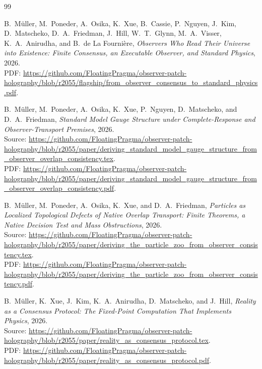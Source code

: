 \documentclass[11pt]{article}
\numberwithin{equation}{section}
\theoremstyle{remark}
\begin{document}
\begin{thebibliography}{99}

B.~M\"uller, M.~Poneder, A.~Osika, K.~Xue, B.~Cassie, P.~Nguyen, J.~Kim, D.~Matscheko, D.~A.~Friedman, J.~Hill, W.~T.~Glynn, M.~A.~Visser, K.~A.~Anirudha, and B.~de La Fourni\`ere,
\emph{Observers Who Read Their Universe into Existence: Finite Consensus, an Executable Observer, and Standard Physics},
2026.\\
PDF: \url{https://github.com/FloatingPragma/observer-patch-holography/blob/r2055/flagship/from_observer_consensus_to_standard_physics.pdf}.

B.~M\"uller, M.~Poneder, A.~Osika, K.~Xue, P.~Nguyen, D.~Matscheko, and D.~A.~Friedman,
\emph{Standard Model Gauge Structure under Complete-Response and Observer-Transport Premises},
2026.\\
Source: \url{https://github.com/FloatingPragma/observer-patch-holography/blob/r2055/paper/deriving_standard_model_gauge_structure_from_observer_overlap_consistency.tex}.\\
PDF: \url{https://github.com/FloatingPragma/observer-patch-holography/blob/r2055/paper/deriving_standard_model_gauge_structure_from_observer_overlap_consistency.pdf}.

B.~M\"uller, M.~Poneder, A.~Osika, K.~Xue, and D.~A.~Friedman,
\emph{Particles as Localized Topological Defects of Native Overlap Transport: Finite Theorems, a Native Decision Test and Mass Obstructions},
2026.\\
Source: \url{https://github.com/FloatingPragma/observer-patch-holography/blob/r2055/paper/deriving_the_particle_zoo_from_observer_consistency.tex}.\\
PDF: \url{https://github.com/FloatingPragma/observer-patch-holography/blob/r2055/paper/deriving_the_particle_zoo_from_observer_consistency.pdf}.

B.~M\"uller, K.~Xue, J.~Kim, K.~A.~Anirudha, D.~Matscheko, and J.~Hill,
\emph{Reality as a Consensus Protocol: The Fixed-Point Computation That Implements Physics},
2026.\\
Source: \url{https://github.com/FloatingPragma/observer-patch-holography/blob/r2055/paper/reality_as_consensus_protocol.tex}.\\
PDF: \url{https://github.com/FloatingPragma/observer-patch-holography/blob/r2055/paper/reality_as_consensus_protocol.pdf}.


\end{thebibliography}
\end{document}

